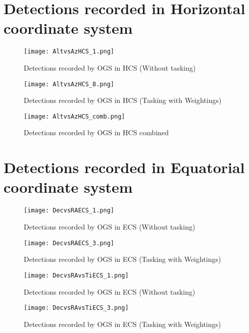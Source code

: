 \newpage
\section{Detections recorded in Horizontal coordinate system}

\begin{figure}[H]
	\centering
	\texttt{[image: AltvsAzHCS\_1.png]}
	\caption{Detections recorded by OGS in HCS (Without tasking)}\label{fig:}
\end{figure}


\begin{figure}[H]
	\centering
	\texttt{[image: AltvsAzHCS\_8.png]}
	\caption{Detections recorded by OGS in HCS (Tasking with Weightings)}\label{fig:}
\end{figure}

\begin{figure}[H]
	\centering
	\texttt{[image: AltvsAzHCS\_comb.png]}
	\caption{Detections recorded by OGS in HCS combined}\label{fig:}
\end{figure}


\newpage
\section{Detections recorded in Equatorial coordinate system}

\begin{figure}[h!]
	\centering
	\texttt{[image: DecvsRAECS\_1.png]}
	\caption{Detections recorded by OGS in ECS (Without tasking)}\label{fig:}
\end{figure}

\begin{figure}[h!]
	\centering
	\texttt{[image: DecvsRAECS\_3.png]}
	\caption{Detections recorded by OGS in ECS (Tasking with Weightings)}\label{fig:}
\end{figure}

\begin{figure}[h!]
	\centering
	\texttt{[image: DecvsRAvsTiECS\_1.png]}
	\caption{Detections recorded by OGS in ECS (Without tasking)}\label{fig:}
\end{figure}

\begin{figure}[h!]
	\centering
	\texttt{[image: DecvsRAvsTiECS\_3.png]}
	\caption{Detections recorded by OGS in ECS (Tasking with Weightings)}\label{fig:}
\end{figure}